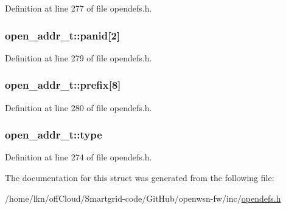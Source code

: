 Definition at line 277 of file opendefs.\+h.

\subsubsection[{\texorpdfstring{panid}{panid}}]{ open\+\_\+addr\+\_\+t\+::panid\mbox{[}2\mbox{]}}\hypertarget{structopen__addr__t_aee6c05ab606841e1fa6a918103abd995}{}\label{structopen__addr__t_aee6c05ab606841e1fa6a918103abd995}


Definition at line 279 of file opendefs.\+h.

\subsubsection[{\texorpdfstring{prefix}{prefix}}]{ open\+\_\+addr\+\_\+t\+::prefix\mbox{[}8\mbox{]}}\hypertarget{structopen__addr__t_a026c06dfd492ddbde8e4d4254fd35ce3}{}\label{structopen__addr__t_a026c06dfd492ddbde8e4d4254fd35ce3}


Definition at line 280 of file opendefs.\+h.

\subsubsection[{\texorpdfstring{type}{type}}]{ open\+\_\+addr\+\_\+t\+::type}\hypertarget{structopen__addr__t_a2abdbb15dedda5606521852a4b4fc0ba}{}\label{structopen__addr__t_a2abdbb15dedda5606521852a4b4fc0ba}


Definition at line 274 of file opendefs.\+h.



The documentation for this struct was generated from the following file\+:\begin{DoxyCompactItemize}
\item 
/home/lkn/off\+Cloud/\+Smartgrid-\/code/\+Git\+Hub/openwsn-\/fw/inc/\hyperlink{opendefs_8h}{opendefs.\+h}\end{DoxyCompactItemize}
